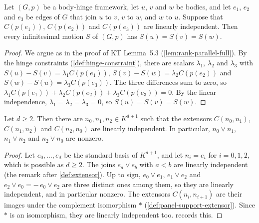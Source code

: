 \begin{lemma}
  \label{lem:theorem-55-triangle}
  \leanok
  Let $(G,p)$ be a body-hinge framework, let $u$, $v$ and $w$ be bodies,
  and let $e_1$, $e_2$ and $e_3$ be edges of $G$ that join $u$ to
  $v$, $v$ to $w$, and $w$ to $u$. Suppose that $C(p(e_1))$, $C(p(e_2))$
  and $C(p(e_3))$ are linearly independent. Then every infinitesimal
  motion $S$ of $(G,p)$ has $S(u) = S(v) = S(w)$.
\end{lemma}
\begin{proof}
  \leanok
  We argue as in the proof of KT Lemma~5.3 (\cref{lem:rank-parallel-full}).
  By the hinge constraints (\cref{def:hinge-constraint}), there are
  scalars $\lambda_1$, $\lambda_2$ and $\lambda_3$ with
  $S(u) - S(v) = \lambda_1 C(p(e_1))$,
  $S(v) - S(w) = \lambda_2 C(p(e_2))$ and
  $S(w) - S(u) = \lambda_3 C(p(e_3))$. The three differences sum to zero,
  so $\lambda_1 C(p(e_1)) + \lambda_2 C(p(e_2)) + \lambda_3 C(p(e_3)) = 0$.
  By the linear independence, $\lambda_1 = \lambda_2 = \lambda_3 = 0$, so
  $S(u) = S(v) = S(w)$.
\end{proof}

\begin{lemma}
  \label{lem:triangle-normals}
  \leanok
  Let $d \ge 2$. Then there are $n_0, n_1, n_2 \in K^{d+1}$ such that the
  extensors $C(n_0, n_1)$, $C(n_1, n_2)$ and $C(n_2, n_0)$ are linearly
  independent. In particular, $n_0 \vee n_1$, $n_1 \vee n_2$ and
  $n_2 \vee n_0$ are nonzero.
\end{lemma}
\begin{proof}
  \leanok
  Let $e_0, \dots, e_d$ be the standard basis of $K^{d+1}$, and let
  $n_i = e_i$ for $i = 0, 1, 2$, which is possible as $d \ge 2$. The
  joins $e_a \vee e_b$ with $a < b$ are linearly independent (the remark
  after \cref{def:extensor}). Up to sign, $e_0 \vee e_1$, $e_1 \vee e_2$
  and $e_2 \vee e_0 = -\,e_0 \vee e_2$ are three distinct ones among them,
  so they are linearly independent, and in particular nonzero. The
  extensors $C(n_i, n_{i+1})$ are their images under the complement
  isomorphism $*$ (\cref{def:panel-support-extensor}). Since $*$ is an
  isomorphism, they are linearly independent too.
   records this.
\end{proof}

